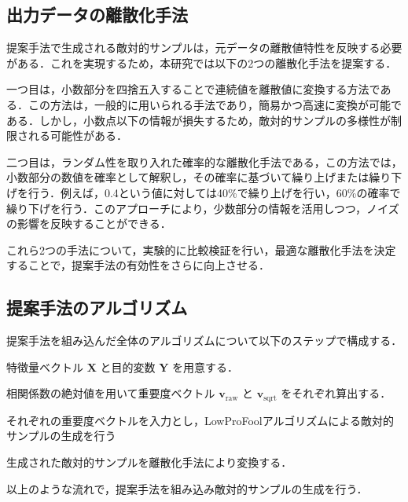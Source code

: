 \subsection{出力データの離散化手法}
提案手法で生成される敵対的サンプルは，元データの離散値特性を反映する必要がある．これを実現するため，本研究では以下の2つの離散化手法を提案する．

一つ目は，小数部分を四捨五入することで連続値を離散値に変換する方法である．この方法は，一般的に用いられる手法であり，簡易かつ高速に変換が可能である．しかし，小数点以下の情報が損失するため，敵対的サンプルの多様性が制限される可能性がある．

二つ目は，ランダム性を取り入れた確率的な離散化手法である，この方法では，小数部分の数値を確率として解釈し，その確率に基づいて繰り上げまたは繰り下げを行う．例えば，0.4という値に対しては40\%で繰り上げを行い，60\%の確率で繰り下げを行う．このアプローチにより，少数部分の情報を活用しつつ，ノイズの影響を反映することができる．

これら2つの手法について，実験的に比較検証を行い，最適な離散化手法を決定することで，提案手法の有効性をさらに向上させる．

\subsection{提案手法のアルゴリズム}
提案手法を組み込んだ全体のアルゴリズムについて以下のステップで構成する．

\begin{algorithm_step}
    \item[Step 1)] 特徴量ベクトル $\bm{X}$ と目的変数 $\bm{Y}$ を用意する．
    \item[Step 2)] 相関係数の絶対値を用いて重要度ベクトル $\bm{v_{\mathrm{raw}}}$ と $\bm{v_{\mathrm{sqrt}}}$ をそれぞれ算出する．
    \item[Step 3)] それぞれの重要度ベクトルを入力とし，LowProFoolアルゴリズムによる敵対的サンプルの生成を行う
    \item[Step 4)] 生成された敵対的サンプルを離散化手法により変換する．
\end{algorithm_step}

以上のような流れで，提案手法を組み込み敵対的サンプルの生成を行う．